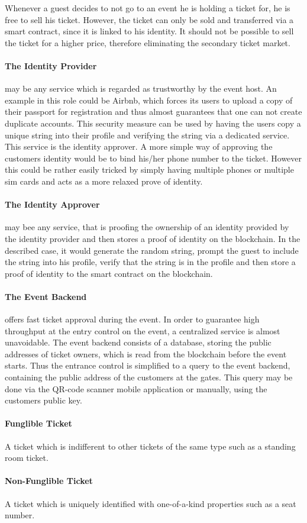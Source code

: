 Whenever a guest decides to not go to an event he is holding a ticket for, he is free to sell his ticket. However, the ticket can only be sold and transferred via a smart contract, since it is linked to his identity. It should not be possible to sell the ticket for a higher price, therefore eliminating the secondary ticket market.

\paragraph{The Identity Provider} may be any service which is regarded as trustworthy by the event host. An example in this role could be Airbnb, which forces its users to upload a copy of their passport for registration and thus almost guarantees that one can not create duplicate accounts. This security measure can be used by having the users copy a unique string into their profile and verifying the string via a dedicated service. This service is the identity approver. A more simple way of approving the customers identity would be to bind his/her phone number to the ticket. However this could be rather easily tricked by simply having multiple phones or multiple sim cards and acts as a more relaxed prove of identity.

\paragraph{The Identity Approver} may bee any service, that is proofing the ownership of an identity provided by the identity provider and then stores a proof of identity on the blockchain. In the described case, it would generate the random string, prompt the guest to include the string into his profile, verify that the string is in the profile and then store a proof of identity to the smart contract on the blockchain.

\paragraph{The Event Backend} offers fast ticket approval during the event. In order to guarantee high throughput at the entry control on the event, a centralized service is almost unavoidable. The event backend consists of a database, storing the public addresses of ticket owners, which is read from the blockchain before the event starts. Thus the entrance control is simplified to a query to the event backend, containing the public address of the customers at the gates. This query may be done via the QR-code scanner mobile application or manually, using the customers public key.

\paragraph{Funglible Ticket}A ticket which is indifferent to other tickets of the same type such as a standing room ticket.

\paragraph{Non-Funglible Ticket}A ticket which is uniquely identified with one-of-a-kind properties such as a seat number.
